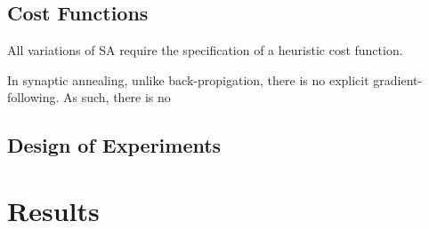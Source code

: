 \documentclass[11pt]{afthesis}
\begin{document}
	
	
	
	
	

	\section{Cost Functions}
	\label{scn:cost_functions}
	All variations of SA require the specification of a heuristic cost function. 
	
	In synaptic annealing, unlike back-propigation, there is no explicit gradient-following. As such, there is no 
	
	
	\section{Design of Experiments}
	
	
	\chapter{Results}
	\label{ch:results}
	
	\makeatletter
	\def\fixedlabel#1#2{%
		\@bsphack%
		\protected@write\@auxout{}%
		{\string\newlabel{#1}{{#2}{\thepage}}}%
		\@esphack}
	\makeatother
	
\end{document}
